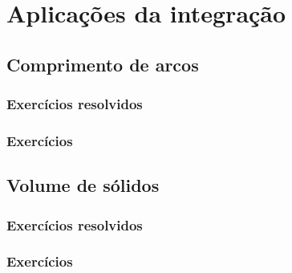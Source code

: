 
\chapter{Aplicações da integração}\label{cap:apl_integracao}

\emconstrucao

\section{Comprimento de arcos}
\construirSec

\subsection*{Exercícios resolvidos}

\construirExeresol


\subsection*{Exercícios}

\construirExer


\section{Volume de sólidos}
\construirSec

\subsection*{Exercícios resolvidos}

\construirExeresol


\subsection*{Exercícios}

\construirExer




